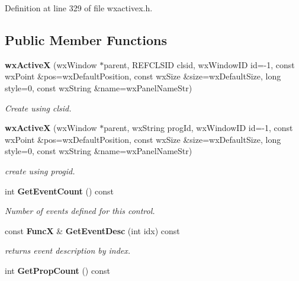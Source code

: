 Definition at line 329 of file wxactivex.h.\subsection*{Public Member Functions}
\begin{CompactItemize}
\item 
{}
{\bf wx\-Active\-X} (wx\-Window $\ast$parent, REFCLSID clsid, wx\-Window\-ID id=-1, const wx\-Point \&pos=wx\-Default\-Position, const wx\-Size \&size=wx\-Default\-Size, long style=0, const wx\-String \&name=wx\-Panel\-Name\-Str)\label{classwxActiveX_a0}

\begin{CompactList}\small\item\em Create using clsid.\item\end{CompactList}\item 
{}
{\bf wx\-Active\-X} (wx\-Window $\ast$parent, wx\-String prog\-Id, wx\-Window\-ID id=-1, const wx\-Point \&pos=wx\-Default\-Position, const wx\-Size \&size=wx\-Default\-Size, long style=0, const wx\-String \&name=wx\-Panel\-Name\-Str)\label{classwxActiveX_a1}

\begin{CompactList}\small\item\em create using progid.\item\end{CompactList}\item 
{}
int {\bf Get\-Event\-Count} () const\label{classwxActiveX_a3}

\begin{CompactList}\small\item\em Number of events defined for this control.\item\end{CompactList}\item 
const {\bf Func\-X} \& {\bf Get\-Event\-Desc} (int idx) const
\begin{CompactList}\small\item\em returns event description by index.\item\end{CompactList}\item 
{}
int {\bf Get\-Prop\-Count} () const\label{classwxActiveX_a5}


\end{CompactItemize}
